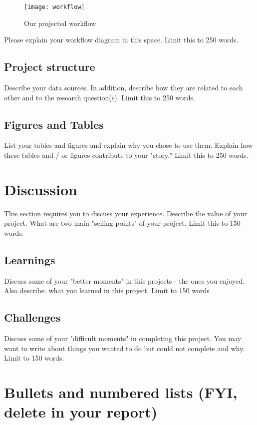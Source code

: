 \documentclass{article}
\begin{document}
\begin{figure}
  \centering
	\texttt{[image: workflow]}
  \caption{Our projected workflow}
\end{figure}

Please explain your workflow diagram in this space. Limit this to 250 words.

\subsection{Project structure}

Describe your data sources. In addition, describe how they are related to each other and to the research question(s). Limit this to 250 words.

\subsection{Figures and Tables}

List your tables and figures and explain why you chose to use them. Explain how these tables and / or figures contribute to your "story." Limit this to 250 words.

\section{Discussion}

This section requires you to discuss your experience. Describe the value of your project. What are two main "selling points" of your project. Limit this to 150 words.

\subsection{Learnings}

Discuss some of your "better moments" in this projects - the ones you enjoyed. Also describe. what you learned in this project. Limit to 150 words

\subsection{Challenges}

Discuss some of your "difficult moments" in completing this project. You may want to write about things you wanted to do but could not complete and why. Limit to 150 words.

\section{Bullets and numbered lists (FYI, delete in your report)}
\end{document}
